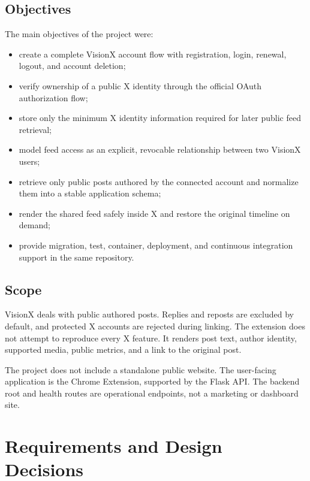 \documentclass[11pt,a4paper]{report}
\begin{document}
\section{Objectives}
The main objectives of the project were:

\begin{itemize}
  \item create a complete VisionX account flow with registration, login,
  renewal, logout, and account deletion;
  \item verify ownership of a public X identity through the official OAuth
  authorization flow;
  \item store only the minimum X identity information required for later public
  feed retrieval;
  \item model feed access as an explicit, revocable relationship between two
  VisionX users;
  \item retrieve only public posts authored by the connected account and
  normalize them into a stable application schema;
  \item render the shared feed safely inside X and restore the original
  timeline on demand;
  \item provide migration, test, container, deployment, and continuous
  integration support in the same repository.
\end{itemize}

\section{Scope}
VisionX deals with public authored posts. Replies and reposts are excluded by
default, and protected X accounts are rejected during linking. The extension
does not attempt to reproduce every X feature. It renders post text, author
identity, supported media, public metrics, and a link to the original post.

The project does not include a standalone public website. The user-facing
application is the Chrome Extension, supported by the Flask API. The backend
root and health routes are operational endpoints, not a marketing or dashboard
site.

\chapter{Requirements and Design Decisions}
\end{document}
